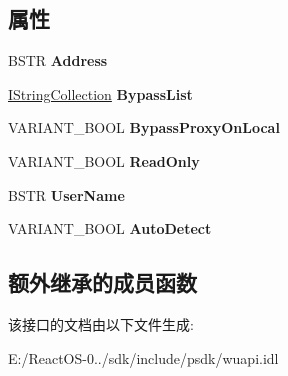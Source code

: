 \subsection*{属性}
\begin{DoxyCompactItemize}
\item 
\mbox{\label{interface_w_u_api_lib_1_1_i_web_proxy_a9489a171e5adc761f812e4b157fbfa4f}} 
B\+S\+TR {\bfseries Address}
\item 
\mbox{\label{interface_w_u_api_lib_1_1_i_web_proxy_aa4595ef39be0fe7b25a7d347e7065d25}} 
\hyperlink{interface_w_u_api_lib_1_1_i_string_collection}{I\+String\+Collection} {\bfseries Bypass\+List}
\item 
\mbox{\label{interface_w_u_api_lib_1_1_i_web_proxy_a26fb3ede4c74f2bad79a2d9c36fc12b2}} 
V\+A\+R\+I\+A\+N\+T\+\_\+\+B\+O\+OL {\bfseries Bypass\+Proxy\+On\+Local}
\item 
\mbox{\label{interface_w_u_api_lib_1_1_i_web_proxy_a04dd9efafa3bccf0e4ec355f3fe51482}} 
V\+A\+R\+I\+A\+N\+T\+\_\+\+B\+O\+OL {\bfseries Read\+Only}
\item 
\mbox{\label{interface_w_u_api_lib_1_1_i_web_proxy_adf9d252ea71c211b56b1596ff454f73b}} 
B\+S\+TR {\bfseries User\+Name}
\item 
\mbox{\label{interface_w_u_api_lib_1_1_i_web_proxy_a3005e4bfc0ea69d078bd0f2eb2cf68e6}} 
V\+A\+R\+I\+A\+N\+T\+\_\+\+B\+O\+OL {\bfseries Auto\+Detect}
\end{DoxyCompactItemize}
\subsection*{额外继承的成员函数}


该接口的文档由以下文件生成\+:\begin{DoxyCompactItemize}
\item 
E\+:/\+React\+O\+S-\/0../sdk/include/psdk/wuapi.\+idl\end{DoxyCompactItemize}
